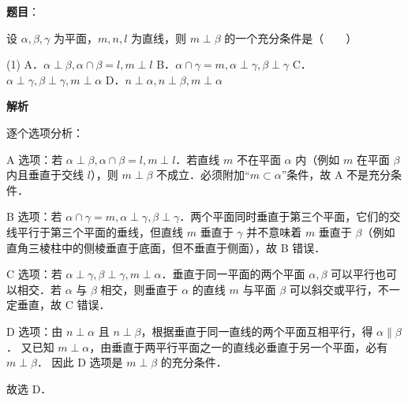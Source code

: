 \begin{answer}

\textbf{题目}：

设 $\alpha, \beta, \gamma$ 为平面，$m, n, l$ 为直线，则 $m \perp \beta$ 的一个充分条件是\mbox{（　　）}

\begin{gkopts}(1)
\task A．$\alpha \perp \beta, \alpha \cap \beta = l, m \perp l$
\task B．$\alpha \cap \gamma = m, \alpha \perp \gamma, \beta \perp \gamma$
\task C．$\alpha \perp \gamma, \beta \perp \gamma, m \perp \alpha$
\task D．$n \perp \alpha, n \perp \beta, m \perp \alpha$
\end{gkopts}

\textbf{解析}

逐个选项分析：

A 选项：若 $\alpha \perp \beta, \alpha \cap \beta = l, m \perp l$．若直线 $m$ 不在平面 $\alpha$ 内（例如 $m$ 在平面 $\beta$ 内且垂直于交线 $l$），则 $m \perp \beta$ 不成立．必须附加“$m \subset \alpha$”条件，故 A 不是充分条件．

B 选项：若 $\alpha \cap \gamma = m, \alpha \perp \gamma, \beta \perp \gamma$．两个平面同时垂直于第三个平面，它们的交线平行于第三个平面的垂线，但直线 $m$ 垂直于 $\gamma$ 并不意味着 $m$ 垂直于 $\beta$（例如直角三棱柱中的侧棱垂直于底面，但不垂直于侧面），故 B 错误．

C 选项：若 $\alpha \perp \gamma, \beta \perp \gamma, m \perp \alpha$．垂直于同一平面的两个平面 $\alpha, \beta$ 可以平行也可以相交．若 $\alpha$ 与 $\beta$ 相交，则垂直于 $\alpha$ 的直线 $m$ 与平面 $\beta$ 可以斜交或平行，不一定垂直，故 C 错误．

D 选项：由 $n \perp \alpha$ 且 $n \perp \beta$，根据垂直于同一直线的两个平面互相平行，得 $\alpha \parallel \beta$．
又已知 $m \perp \alpha$，由垂直于两平行平面之一的直线必垂直于另一个平面，必有 $m \perp \beta$．
因此 D 选项是 $m \perp \beta$ 的充分条件．

故选 D．


\end{answer}
